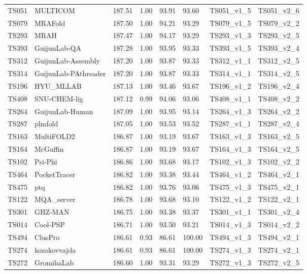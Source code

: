 \begin{longtable}{llllllll}
TS051 & MULTICOM & 187.51 & 1.00 & 93.91 & 93.60 & TS051\_v1\_5 & TS051\_v2\_6 \\ 
TS079 & MRAFold & 187.50 & 1.00 & 94.21 & 93.29 & TS079\_v1\_5 & TS079\_v2\_2 \\ 
TS293 & MRAH & 187.47 & 1.00 & 94.17 & 93.29 & TS293\_v1\_3 & TS293\_v2\_5 \\ 
TS393 & GuijunLab-QA & 187.28 & 1.00 & 93.95 & 93.33 & TS393\_v1\_5 & TS393\_v2\_4 \\ 
TS312 & GuijunLab-Assembly & 187.20 & 1.00 & 93.87 & 93.33 & TS312\_v1\_1 & TS312\_v2\_5 \\ 
TS314 & GuijunLab-PAthreader & 187.20 & 1.00 & 93.87 & 93.33 & TS314\_v1\_1 & TS314\_v2\_5 \\ 
TS196 & HYU\_MLLAB & 187.13 & 1.00 & 93.46 & 93.67 & TS196\_v1\_2 & TS196\_v2\_4 \\ 
TS408 & SNU-CHEM-lig & 187.12 & 0.99 & 94.06 & 93.06 & TS408\_v1\_1 & TS408\_v2\_2 \\ 
TS264 & GuijunLab-Human & 187.09 & 1.00 & 93.95 & 93.14 & TS264\_v1\_3 & TS264\_v2\_2 \\ 
TS287 & plmfold & 187.05 & 1.00 & 93.53 & 93.52 & TS287\_v1\_1 & TS287\_v2\_4 \\ 
TS163 & MultiFOLD2 & 186.87 & 1.00 & 93.19 & 93.67 & TS163\_v1\_3 & TS163\_v2\_5 \\ 
TS164 & McGuffin & 186.87 & 1.00 & 93.19 & 93.67 & TS164\_v1\_3 & TS164\_v2\_5 \\ 
TS102 & Psi-Phi & 186.86 & 1.00 & 93.68 & 93.17 & TS102\_v1\_3 & TS102\_v2\_2 \\ 
TS464 & PocketTracer & 186.82 & 1.00 & 93.38 & 93.44 & TS464\_v1\_2 & TS464\_v2\_1 \\ 
TS475 & ptq & 186.82 & 1.00 & 93.76 & 93.06 & TS475\_v1\_3 & TS475\_v2\_1 \\ 
TS122 & MQA\_server & 186.78 & 1.00 & 93.68 & 93.10 & TS122\_v1\_2 & TS122\_v2\_1 \\ 
TS301 & GHZ-MAN & 186.75 & 1.00 & 93.38 & 93.37 & TS301\_v1\_1 & TS301\_v2\_4 \\ 
TS014 & Cool-PSP & 186.71 & 1.00 & 93.50 & 93.21 & TS014\_v1\_3 & TS014\_v2\_2 \\ 
TS494 & ClusPro & 186.61 & 0.93 & 86.61 & 100.00 & TS494\_v1\_3 & TS494\_v2\_1 \\ 
TS274 & kozakovvajda & 186.61 & 0.93 & 86.61 & 100.00 & TS274\_v1\_3 & TS274\_v2\_1 \\ 
TS272 & GromihaLab & 186.60 & 1.00 & 93.31 & 93.29 & TS272\_v1\_3 & TS272\_v2\_5 \\ 

\end{longtable}
